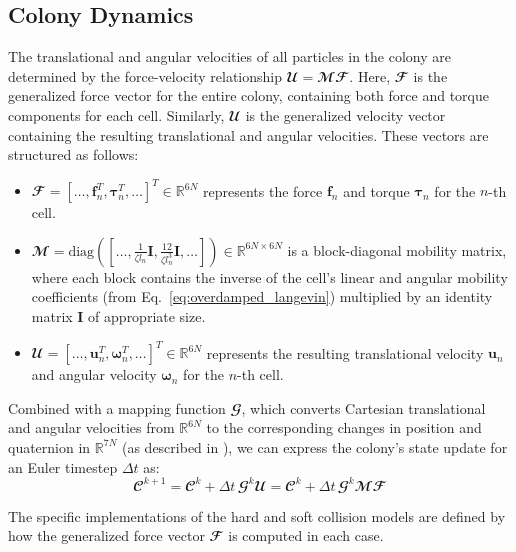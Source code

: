 \documentclass[conference]{IEEEtran}
\begin{document}
\subsection{Colony Dynamics}

The translational and angular velocities of all particles in the colony are determined by the force-velocity relationship $\mathbfcal{U} = \mathbfcal{M} \mathbfcal{F}$. Here, $\mathbfcal{F}$ is the generalized force vector for the entire colony, containing both force and torque components for each cell. Similarly, $\mathbfcal{U}$ is the generalized velocity vector containing the resulting translational and angular velocities. These vectors are structured as follows:

\begin{itemize}
    \item
          $\mathbfcal{F} = [\dots, \mathbf{f}_n^T, \boldsymbol{\tau}_n^T, \dots]^T \in \mathbb{R}^{6N}$ represents the force $\mathbf{f}_n$ and torque $\boldsymbol{\tau}_n$ for the $n$-th cell.
    \item
          $\mathbfcal{M} = \text{diag}([\dots, \frac{1}{\zeta l_n}\mathbf{I}, \frac{12}{\zeta l_n^3}\mathbf{I}, \dots]) \in \mathbb{R}^{6N \times 6N}$ is a block-diagonal mobility matrix, where each block contains the inverse of the cell's linear and angular mobility coefficients (from Eq.~\ref{eq:overdamped_langevin}) multiplied by an identity matrix $\mathbf{I}$ of appropriate size.
    \item
          $\mathbfcal{U} = [\dots, \mathbf{u}_n^T, \boldsymbol{\omega}_n^T, \dots]^T \in \mathbb{R}^{6N}$ represents the resulting translational velocity $\mathbf{u}_n$ and angular velocity $\boldsymbol{\omega}_n$ for the $n$-th cell.
\end{itemize}


Combined with a mapping function $\mathbfcal{G}$, which converts Cartesian translational and angular velocities from $\mathbb{R}^{6N}$ to the corresponding changes in position and quaternion in $\mathbb{R}^{7N}$ (as described in \cite{Weady2024}), we can express the colony's state update for an Euler timestep $\Delta t$ as:
\begin{equation}
    \mathbfcal{C}^{k+1} = \mathbfcal{C}^k + \Delta t \, \mathbfcal{G}^k \mathbfcal{U} = \mathbfcal{C}^k + \Delta t \, \mathbfcal{G}^k \mathbfcal{M} \mathbfcal{F}
\end{equation}
\label{eq:colony_update}

The specific implementations of the hard and soft collision models are defined by how the generalized force vector $\mathbfcal{F}$ is computed in each case.
\end{document}
